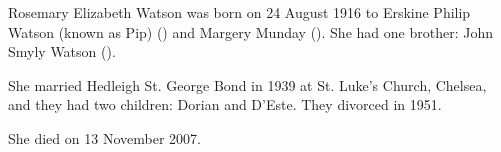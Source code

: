 
Rosemary Elizabeth Watson was born on	24 August 1916 to Erskine Philip Watson (known as Pip) () and Margery Munday (). She had one brother:  John Smyly Watson ().

She married Hedleigh St. George Bond in 1939 at St. Luke's Church, Chelsea,  and they had two children: Dorian and D'Este. They divorced in 1951. 

She died on 13 November 2007.
